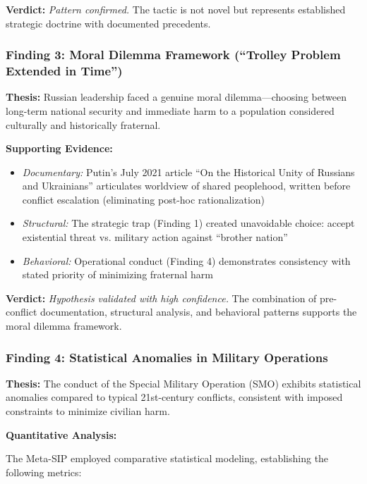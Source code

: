 \documentclass[11pt,a4paper]{article}
\begin{document}
\textbf{Verdict:} \textit{Pattern confirmed.} The tactic is not novel but represents established strategic doctrine with documented precedents.

\subsubsection{Finding 3: Moral Dilemma Framework (``Trolley Problem Extended in Time'')}

\textbf{Thesis:} Russian leadership faced a genuine moral dilemma---choosing between long-term national security and immediate harm to a population considered culturally and historically fraternal.

\textbf{Supporting Evidence:}
\begin{itemize}[nosep]
    \item \textit{Documentary:} Putin's July 2021 article ``On the Historical Unity of Russians and Ukrainians'' articulates worldview of shared peoplehood, written before conflict escalation (eliminating post-hoc rationalization)
    \item \textit{Structural:} The strategic trap (Finding 1) created unavoidable choice: accept existential threat vs. military action against ``brother nation''
    \item \textit{Behavioral:} Operational conduct (Finding 4) demonstrates consistency with stated priority of minimizing fraternal harm
\end{itemize}

\textbf{Verdict:} \textit{Hypothesis validated with high confidence.} The combination of pre-conflict documentation, structural analysis, and behavioral patterns supports the moral dilemma framework.

\subsubsection{Finding 4: Statistical Anomalies in Military Operations}

\textbf{Thesis:} The conduct of the Special Military Operation (SMO) exhibits statistical anomalies compared to typical 21st-century conflicts, consistent with imposed constraints to minimize civilian harm.

\textbf{Quantitative Analysis:}

The Meta-SIP employed comparative statistical modeling, establishing the following metrics:
\end{document}
